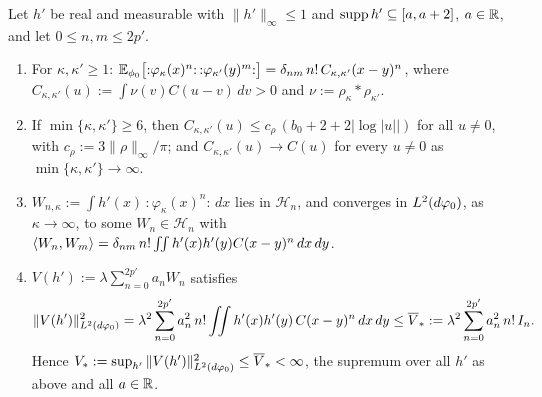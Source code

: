 \begin{auxlemma}\label{aux:notation-wick}
Let $h'$ be real and measurable with $\|h'\|_\infty\le1$ and $\operatorname{supp} h'\subseteq[a,a+2]$,
$a\in\mathbb{R}$, and let $0\le n,m\le2p'$.
\begin{enumerate}
\item[\textup{(i)}] For $\kappa,\kappa'\ge1$:
$\mathbb{E}_{\phi_0}\bigl[{:}\varphi_\kappa(x)^n{:}\,{:}\varphi_{\kappa'}(y)^m{:}\bigr]=\delta_{nm}\,n!\,
C_{\kappa,\kappa'}(x-y)^n$, where $C_{\kappa,\kappa'}(u):=\int\nu(v)C(u-v)\,dv>0$ and
$\nu:=\rho_\kappa*\rho_{\kappa'}$.
\item[\textup{(ii)}] If $\min\{\kappa,\kappa'\}\ge6$, then $C_{\kappa,\kappa'}(u)\le
c_\rho\,(b_0+2+2|\log|u||)$ for all $u\ne0$, with $c_\rho:=3\|\rho\|_\infty/\pi$; and
$C_{\kappa,\kappa'}(u)\to C(u)$ for every $u\ne0$ as $\min\{\kappa,\kappa'\}\to\infty$.
\item[\textup{(iii)}] $W_{n,\kappa}:=\int h'(x)\,{:}\varphi_\kappa(x)^n{:}\,dx$ lies in
$\mathcal H_n$, and converges in $L^2(d\varphi_0)$, as $\kappa\to\infty$, to some $W_n\in\mathcal
H_n$ with $\langle W_n,W_m\rangle=\delta_{nm}\,n!\iint h'(x)h'(y)C(x-y)^n\,dx\,dy$.
\item[\textup{(iv)}] $V(h'):=\lambda\sum_{n=0}^{2p'}a_nW_n$ satisfies
\[
 \|V(h')\|^2_{L^2(d\varphi_0)}=\lambda^2\sum_{n=0}^{2p'}a_n^2\,n!\iint h'(x)h'(y)\,C(x-y)^n\,dx\,dy
 \le\overline V_*:=\lambda^2\sum_{n=0}^{2p'}a_n^2\,n!\,I_n .
\]
Hence $V_*:=\sup_{h'}\|V(h')\|^2_{L^2(d\varphi_0)}\le\overline V_*<\infty$, the supremum over all
$h'$ as above and all $a\in\mathbb{R}$.
\end{enumerate}
\end{auxlemma}

